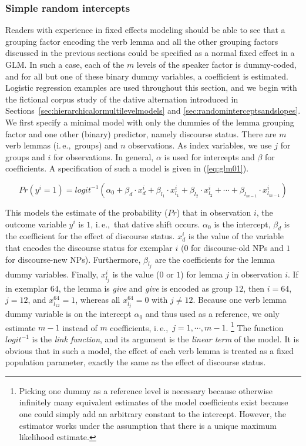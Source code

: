 \documentclass[a4paper,12pt]{article}
\newcommand{\ie}{i.\,e.,\ }
\begin{document}
\subsubsection{Simple random intercepts}
\label{sec:simplerandomintercepts}

Readers with experience in fixed effects modeling should be able to see that a grouping factor encoding the verb lemma and all the other grouping factors discussed in the previous sections could be specified as a normal fixed effect in a GLM.
In such a case, each of the $m$ levels of the speaker factor is dummy-coded, and for all but one of these binary dummy variables, a coefficient is estimated.
Logistic regression examples are used throughout this section, and we begin with the fictional corpus study of the dative alternation introduced in Sections~\ref{sec:hierarchicalormultilevelmodels} and \ref{sec:randominterceptsandslopes}.
We first specify a minimal model with only the dummies of the lemma grouping factor and one other (binary) predictor, namely discourse status.
There are $m$ verb lemmas (\ie groups) and $n$ observations.
As index variables, we use $j$ for groups and $i$ for observations.
In general, $\alpha$ is used for intercepts and $\beta$ for coefficients.
A specification of such a model is given in (\ref{eq:glm01}).

\begin{equation}
  Pr(y^i=1)=logit^{-1}(\alpha_0+\beta_d\cdot x_{d}^i+\beta_{l_1}\cdot x_{l_1}^i+\beta_{l_2}\cdot x_{l_2}^i+\cdots+\beta_{l_{m-1}}\cdot x_{l_{m-1}}^i)
  \label{eq:glm01}
\end{equation}

This models the estimate of the probability ($Pr$) that in observation $i$, the outcome variable $y^i$ is $1$, \ie that dative shift occurs.
$\alpha_0$ is the intercept, $\beta_d$ is the coefficient for the effect of discourse status.
$x_d^i$ is the value of the variable that encodes the discourse status for exemplar $i$ ($0$ for discourse-old NPs and $1$ for discourse-new NPs).
Furthermore, $\beta_{l_j}$ are the coefficients for the lemma dummy variables.
Finally, $x_{l_j}^i$ is the value ($0$ or $1$) for lemma $j$ in observation $i$.
If in exemplar $64$, the lemma is \textit{give} and \textit{give} is encoded as group $12$, then $i=64$, $j=12$, and $x_{l_{12}}^{64}=1$, whereas all $x_{l_j}^{64}=0$ with $j\neq12$.
Because one verb lemma dummy variable is on the intercept $\alpha_0$ and thus used as a reference, we only estimate $m-1$ instead of $m$ coefficients, \ie $j=1,\cdots,m-1$.%
\footnote{Picking one dummy as a reference level is necessary because otherwise infinitely many equivalent estimates of the model coefficients exist because one could simply add an arbitrary constant to the intercept.
However, the estimator works under the assumption that there is a unique maximum likelihood estimate.}
The function $logit^{-1}$ is the \textit{link function}, and its argument is the \textit{linear term} of the model.
It is obvious that in such a model, the effect of each verb lemma is treated as a fixed population parameter, exactly the same as the effect of discourse status.
\end{document}

